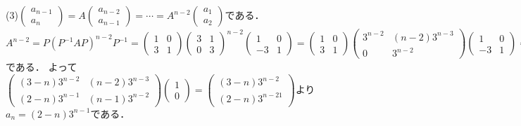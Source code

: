 \documentclass[
		book,
		head_space=20mm,
		foot_space=20mm,
		gutter=10mm,
		line_length=190mm
]{jlreq}
\begin{document}
(3)$\begin{pmatrix}
a_{n-1}\\a_n
\end{pmatrix}=A\begin{pmatrix}
a_{n-2}\\a_{n-1}
\end{pmatrix}=\cdots=A^{n-2}\begin{pmatrix}
a_1\\a_2
\end{pmatrix}$である．
$A^{n-2}=P(P^{-1}AP)^{n-2}P^{-1}=\begin{pmatrix}
1&0\\
3&1
\end{pmatrix}\begin{pmatrix}
3&1\\
0&3
\end{pmatrix}^{n-2}\begin{pmatrix}
1&0\\
-3&1
\end{pmatrix}=\begin{pmatrix}
1&0\\
3&1
\end{pmatrix}\begin{pmatrix}
3^{n-2}&(n-2)3^{n-3}\\
0&3^{n-2}
\end{pmatrix}\begin{pmatrix}
1&0\\
-3&1
\end{pmatrix}=\begin{pmatrix}
3^{n-2}&(n-2)3^{n-3}\\
3^{n-1}&(n-1)3^{n-2}
\end{pmatrix}\begin{pmatrix}
1&0\\
-3&1
\end{pmatrix}=\begin{pmatrix}
(3-n)3^{n-2}&(n-2)3^{n-3}\\
(2-n)3^{n-1}&(n-1)3^{n-2}
\end{pmatrix}$である．
よって$\begin{pmatrix}
(3-n)3^{n-2}&(n-2)3^{n-3}\\
(2-n)3^{n-1}&(n-1)3^{n-2}
\end{pmatrix}\begin{pmatrix}
1\\0
\end{pmatrix}=\begin{pmatrix}
(3-n)3^{n-2}\\(2-n)3^{n-21}
\end{pmatrix}$より$a_n=(2-n)3^{n-1}$である．
\end{document}
